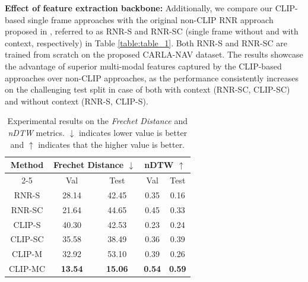 \documentclass[letterpaper, 10 pt, conference]{ieeeconf}  %
\begin{document}
\textbf{Effect of feature extraction backbone: }Additionally, we compare our CLIP-based single frame approaches with the original non-CLIP RNR approach proposed in \cite{Rufus_2021}, referred to as RNR-S and RNR-SC (single frame without and with context, respectively) in Table \ref{table:table_1}. Both RNR-S and RNR-SC are trained from scratch on the proposed CARLA-NAV dataset. The results showcase the advantage of superior multi-modal features captured by the CLIP-based approaches over non-CLIP approaches, as the performance consistently increases on the challenging test split in case of both with context (RNR-SC, CLIP-SC) and without context (RNR-S, CLIP-S).

\begin{table}[htp]
\begin{center}
\small
\begin{tabular}{|c|cc|cc|}
\hline
\multirow{2}{*}{Method} & \multicolumn{2}{c|}{Frechet Distance $\downarrow$}                & \multicolumn{2}{c|}{nDTW $\uparrow$}                          \\ \cline{2-5} 
        & \multicolumn{1}{c|}{Val}   & Test  & \multicolumn{1}{c|}{Val}  & Test \\ \hline
RNR-S   & \multicolumn{1}{c|}{28.14} & 42.45 & \multicolumn{1}{c|}{0.35} & 0.16 \\ \hline
RNR-SC  & \multicolumn{1}{c|}{21.64} & 44.65 & \multicolumn{1}{c|}{0.45} & 0.33 \\ \hline
CLIP-S  & \multicolumn{1}{c|}{40.30} & 42.53 & \multicolumn{1}{c|}{0.23} & 0.24 \\ \hline
CLIP-SC & \multicolumn{1}{c|}{35.58} & 38.49 & \multicolumn{1}{c|}{0.36} & 0.39 \\ \hline
CLIP-M  & \multicolumn{1}{c|}{32.92} & 53.10 & \multicolumn{1}{c|}{0.39} & 0.26 \\ \hline
CLIP-MC                 & \multicolumn{1}{c|}{\textbf{13.54}} & \textbf{15.06} & \multicolumn{1}{c|}{\textbf{0.54}} & \textbf{0.59} \\ \hline
\end{tabular}
\end{center}
\caption{Experimental results on the \textit{Frechet Distance} and \textit{nDTW} metrics. $\downarrow$ indicates lower value is better and $\uparrow$ indicates that the higher value is better.}
\label{table:table_2}
\end{table}
\vspace{-1em}
\end{document}
